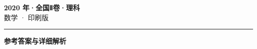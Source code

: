 \documentclass[zihao=5, a4paper]{ctexart}
\begin{document}
\begin{center}
  {\Large\bfseries 2020 年·全国Ⅱ卷·理科}\\[4pt]
  {\large 数学 · 印刷版}
\end{center}
\medskip
{}

\par\bigskip\hrule\bigskip
{}
\Needspace{0.55\textheight}
\begin{center}{\large\bfseries 参考答案与详细解析}\end{center}
\smallskip

\end{document}
